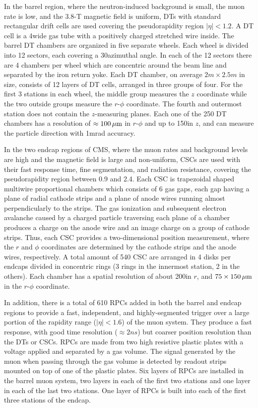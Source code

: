 In the barrel region, where the neutron-induced background is small, the muon rate is low, and the 3.8-T magnetic field is uniform, DTs with standard rectangular drift cells are used covering the pseudorapidity region $|\eta| < 1.2$. A DT cell is a 4\cm wide gas tube with a positively charged stretched wire inside. 
The barrel DT chambers are organized in five separate wheels. Each wheel is divided into 12 sectors, each covering a 30\de azimuthal angle. In each of the 12 sectors there are 4 chambers per wheel which are concentric around the beam line and separated by the iron return yoke. Each DT chamber, on average $2\unit{m}\times2.5\unit{m}$ in size, consists of 12 layers of DT cells, arranged in three groups of four. For the first 3 stations in each wheel, the middle group measures the $z$ coordinate while the two outside groups measure the $r$-$\phi$ coordinate. The fourth and outermost station does not contain the $z$-measuring planes. Each one of the 250 DT chambers has a resolution of $\approx100\,\mu\text{m}$ in $r$-$\phi$ and up to 150\mum in $z$, and can measure the particle direction with 1\unit{mrad} accuracy.

In the two endcap regions of CMS, where the muon rates and background levels are high and the magnetic field is large and non-uniform, CSCs are used with their fast response time, fine segmentation, and radiation resistance, covering the pseudorapidity region between 0.9 and 2.4. 
Each CSC is trapezoidal shaped multiwire proportional chambers which consists of 6 gas gaps, each gap having a plane of radial cathode strips and a plane of anode wires running almost perpendicularly to the strips. The gas ionization and subsequent electron avalanche caused by a charged particle traversing each plane of a chamber produces a charge on the anode wire and an image charge on a group of cathode strips. Thus, each CSC provides a two-dimensional position measurement, where the $r$ and $\phi$ coordinates are determined by the cathode strips and the anode wires, respectively. A total amount of 540 CSC are arranged in 4 disks per endcaps divided in concentric rings (3 rings in the innermost station, 2 in the others). Each chamber has a spatial resolution of about 200\mm in $r$, and $75\times150\,\mu\text{m}$ in the $r$-$\phi$ coordinate.

In addition, there is a total of 610 RPCs added in both the barrel and endcap regions to provide a fast, independent, and highly-segmented trigger over a large portion of the rapidity range ($|\eta| < 1.6$) of the muon system. They produce a fast response, with good time resolution ($\approx2\unit{ns}$) but coarser position resolution than the DTs or CSCs. RPCs are made from two high resistive plastic plates with a voltage applied and separated by a gas volume. The signal generated by the muon when passing through the gas volume is detected by readout strips mounted on top of one of the plastic plates. Six layers of RPCs are installed in the barrel muon system, two layers in each of the first two stations and one layer in each of the last two stations. One layer of RPCs is built into each of the first three stations of the endcap.

